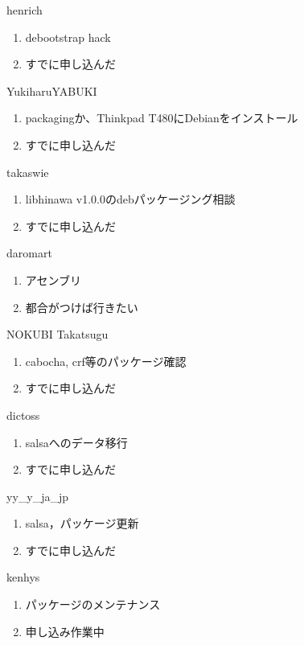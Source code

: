 \begin{prework}{ henrich }
  \begin{enumerate}
  \item debootstrap hack
  \item すでに申し込んだ
  \end{enumerate}
\end{prework}

\begin{prework}{ YukiharuYABUKI }
  \begin{enumerate}
  \item packagingか、Thinkpad T480にDebianをインストール
  \item すでに申し込んだ
  \end{enumerate}
\end{prework}

\begin{prework}{ takaswie }
  \begin{enumerate}
  \item libhinawa v1.0.0のdebパッケージング相談
  \item すでに申し込んだ
  \end{enumerate}
\end{prework}

\begin{prework}{ daromart }
  \begin{enumerate}
  \item アセンブリ
  \item 都合がつけば行きたい
  \end{enumerate}
\end{prework}

\begin{prework}{ NOKUBI Takatsugu }
  \begin{enumerate}
  \item cabocha, crf等のパッケージ確認
  \item すでに申し込んだ
  \end{enumerate}
\end{prework}

\begin{prework}{ dictoss }
  \begin{enumerate}
  \item salsaへのデータ移行
  \item すでに申し込んだ
  \end{enumerate}
\end{prework}

\begin{prework}{ yy\_y\_ja\_jp }
  \begin{enumerate}
  \item salsa，パッケージ更新
  \item すでに申し込んだ
  \end{enumerate}
\end{prework}

\begin{prework}{ kenhys }
  \begin{enumerate}
  \item パッケージのメンテナンス
  \item 申し込み作業中
  \end{enumerate}
\end{prework}
